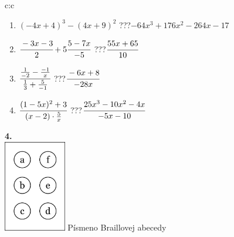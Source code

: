 \documentclass[10pt]{report}
\begin{document}
\begin{tabular}{c:c}
\begin{minipage}[c][104.5mm][t]{0.5\linewidth}
\begin{center}
\begin{minipage}{0.79\linewidth}
\begin{center}
\begin{varwidth}{\linewidth}
\begin{enumerate}
\item $(-4x+4)^3-(4x+9)^2$\quad \dotfill\; ???\;\dotfill \quad $-64x^3+176x^2-264x-17$
\item $\cfrac{-3x-3}{2}+5\cfrac{5-7x}{-5}$\quad \dotfill\; ???\;\dotfill \quad $\cfrac{55x+65}{10}$
\item $\cfrac{\frac{1}{-2}-\frac{-1}{x}}{\frac{1}{3}+\frac{5}{-1}}$\quad \dotfill\; ???\;\dotfill \quad $\cfrac{-6x+8}{-28x}$
\item $\cfrac{(1-5x)^2+3}{(x-2)\cdot\frac{5}{x}}$\quad \dotfill\; ???\;\dotfill \quad $\cfrac{25x^3-10x^2-4x}{-5x-10}$
\end{enumerate}
\end{varwidth}
\end{center}
\end{minipage}
\begin{minipage}{0.20\linewidth}
\begin{center}
{\Huge\bfseries 4.} \\[2mm]
\includegraphics[height=40mm]{../images/braille.png}
{\small Písmeno Braillovej abecedy}
\end{center}
\end{minipage}
\end{center}
\end{minipage}
%
\end{tabular}
\newpage
\thispagestyle{empty}
\end{document}
